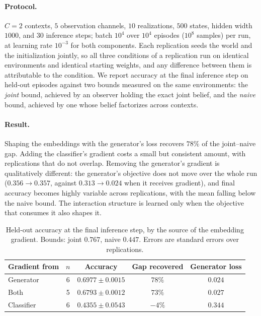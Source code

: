 \paragraph{Protocol.}
$C=2$ contexts, $5$ observation channels, $10$ realizations, $500$ states, hidden
width $1000$, and $30$ inference steps; batch $10^4$ over $10^4$ episodes ($10^8$
samples) per run, at learning rate $10^{-3}$ for both components. Each replication
seeds the world and the initialization jointly, so all three conditions of a
replication run on identical environments and identical starting weights, and any
difference between them is attributable to the condition. We report accuracy at the
final inference step on held-out episodes against two bounds measured on the same
environments: the \emph{joint} bound, achieved by an observer holding the exact joint
belief, and the \emph{naive} bound, achieved by one whose belief factorizes across
contexts.

\paragraph{Result.}
Shaping the embeddings with the generator's loss recovers $78\%$ of the joint--naive
gap. Adding the classifier's gradient costs a small but consistent amount, with
replications that do not overlap. Removing the generator's gradient is qualitatively
different: the generator's objective does not move over the whole run
($0.356 \rightarrow 0.357$, against $0.313 \rightarrow 0.024$ when it receives
gradient), and final accuracy becomes highly variable across replications, with the
mean falling below the naive bound. The interaction structure is learned only when
the objective that consumes it also shapes it.

\begin{table}[t]
\centering
\caption{Held-out accuracy at the final inference step, by the source of the
embedding gradient. Bounds: joint $0.767$, naive $0.447$. Errors are standard errors
over replications.}
\label{tab:embedding-gradient}
\begin{tabular}{lcccc}
\toprule
Gradient from & $n$ & Accuracy & Gap recovered & Generator loss \\
\midrule
Generator  & 6 & $0.6977 \pm 0.0015$ & $78\%$  & $0.024$ \\
Both       & 5 & $0.6793 \pm 0.0012$ & $73\%$  & $0.027$ \\
Classifier & 6 & $0.4355 \pm 0.0543$ & $-4\%$  & $0.344$ \\
\bottomrule
\end{tabular}
\end{table}
